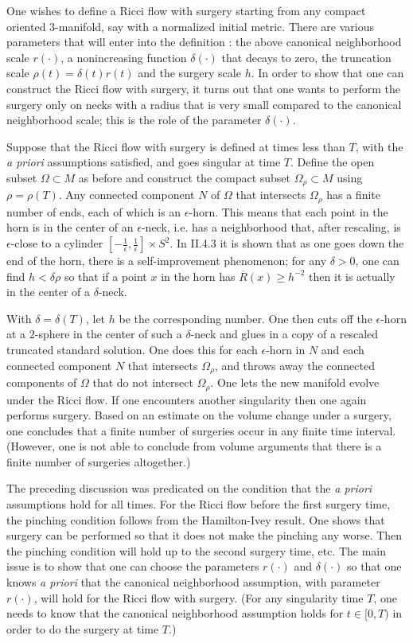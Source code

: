 \documentclass[12pt]{amsart}
\numberwithin{equation}{section}
\theoremstyle{plain}
\theoremstyle{definition}
\theoremstyle{remark}
\begin{document}
One wishes to define a Ricci flow with
surgery starting from any compact oriented $3$-manifold, say with a
normalized initial metric.  There are
various parameters that will enter into the definition : the above canonical neighborhood scale
$r(\cdot)$,
a nonincreasing function $\delta(\cdot)$ that decays to zero, the truncation
scale $\rho(t) = \delta(t) r(t)$ and the surgery scale $h$. In order
to show that one can construct the Ricci flow with surgery, it turns out that one wants to perform
the surgery only on necks with a radius that is very small compared to the
canonical neighborhood scale; this is the role of the parameter $\delta(\cdot)$.

Suppose that the Ricci flow with surgery is defined at times less than $T$, with
the {\it a priori} assumptions satisfied, and goes
singular at time $T$. Define the open subset $\Omega \subset M$ as before and 
construct the compact subset $\Omega_\rho \subset M$ 
using $\rho = \rho(T)$. Any connected component $N$ of $\Omega$ that
intersects $\Omega_\rho$ has a finite number of ends, each of which is an
$\epsilon$-horn.  This means that each point in the horn is in the center of
an $\epsilon$-neck, i.e. has a neighborhood
that, after rescaling, is $\epsilon$-close to a cylinder $\left[ - \frac{1}{\epsilon},
\frac{1}{\epsilon} \right] \times S^2$. In II.4.3 it is shown that as one goes down the
end of the horn, there is a self-improvement phenomenon; for any
$\delta > 0$, one can find $h < \delta \rho$ so that if a point $x$ in the horn has
$\overline{R}(x) \ge h^{-2}$ then it is actually in the center of a $\delta$-neck. 

With $\delta = \delta(T)$, let
$h$ be the corresponding number. One then
cuts off the $\epsilon$-horn at a $2$-sphere in the center of such a
$\delta$-neck and glues in a copy of a rescaled truncated standard solution.
One does this for each $\epsilon$-horn in $N$ and each connected component
$N$ that intersects $\Omega_\rho$, and throws away the connected components
of $\Omega$ that do not intersect $\Omega_\rho$. One lets the new manifold evolve 
under the Ricci flow. If one encounters another singularity then one again
performs surgery.  Based on an estimate on the volume change under a surgery,
one concludes that a finite number of surgeries occur in any finite time
interval. (However, 
one is not able to conclude from volume arguments that there is a finite
number of surgeries altogether.)

The preceding discussion was predicated on the condition that the
{\it a priori} assumptions hold for all times.  For the Ricci flow
before the first surgery time, the pinching condition
follows from the Hamilton-Ivey result.  One shows
that surgery can be performed so that it does not make the pinching any worse.
Then the pinching condition will hold up to the second surgery time, etc.
The main issue is to show that one can choose the parameters
$r(\cdot)$ and $\delta(\cdot)$ so that one knows {\it a priori} that the canonical 
neighborhood assumption, with parameter $r(\cdot)$, will hold for the
Ricci flow with surgery. (For any singularity time $T$, one needs to know that the
canonical neighborhood assumption holds for $t \in [0, T)$ in order to do the
surgery at time $T$.)
\end{document}

